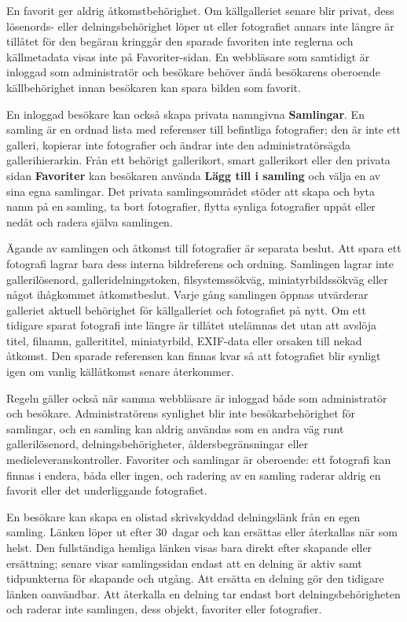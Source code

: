 \documentclass[11pt,a4paper]{article}
\newcommand{\ui}[1]{\textbf{#1}}
\begin{document}
En favorit ger aldrig åtkomstbehörighet. Om källgalleriet senare blir privat,
dess lösenords- eller delningsbehörighet löper ut eller fotografiet annars inte
längre är tillåtet för den begäran kringgår den sparade favoriten inte reglerna
och källmetadata visas inte på Favoriter-sidan. En webbläsare som samtidigt är
inloggad som administratör och besökare behöver ändå besökarens oberoende
källbehörighet innan besökaren kan spara bilden som favorit.

En inloggad besökare kan också skapa privata namngivna \ui{Samlingar}. En
samling är en ordnad lista med referenser till befintliga fotografier; den är
inte ett galleri, kopierar inte fotografier och ändrar inte den
administratörsägda gallerihierarkin. Från ett behörigt gallerikort, smart
gallerikort eller den privata sidan \ui{Favoriter} kan besökaren använda
\ui{Lägg till i samling} och välja en av sina egna samlingar. Det privata
samlingsområdet stöder att skapa och byta namn på en samling, ta bort
fotografier, flytta synliga fotografier uppåt eller nedåt och radera själva
samlingen.

Ägande av samlingen och åtkomst till fotografier är separata beslut. Att spara
ett fotografi lagrar bara dess interna bildreferens och ordning. Samlingen
lagrar inte gallerilösenord, galleridelningstoken, filsystemssökväg,
miniatyrbildssökväg eller något ihågkommet åtkomstbeslut. Varje gång samlingen
öppnas utvärderar galleriet aktuell behörighet för källgalleriet och fotografiet
på nytt. Om ett tidigare sparat fotografi inte längre är tillåtet utelämnas det
utan att avslöja titel, filnamn, gallerititel, miniatyrbild, EXIF-data eller
orsaken till nekad åtkomst. Den sparade referensen kan finnas kvar så att
fotografiet blir synligt igen om vanlig källåtkomst senare återkommer.

Regeln gäller också när samma webbläsare är inloggad både som administratör och
besökare. Administratörens synlighet blir inte besökarbehörighet för samlingar,
och en samling kan aldrig användas som en andra väg runt gallerilösenord,
delningsbehörigheter, åldersbegränsningar eller medieleveranskontroller.
Favoriter och samlingar är oberoende: ett fotografi kan finnas i endera, båda
eller ingen, och radering av en samling raderar aldrig en favorit eller det
underliggande fotografiet.

En besökare kan skapa en olistad skrivskyddad delningslänk från en egen samling.
Länken löper ut efter 30~dagar och kan ersättas eller återkallas när som helst.
Den fullständiga hemliga länken visas bara direkt efter skapande eller
ersättning; senare visar samlingssidan endast att en delning är aktiv samt
tidpunkterna för skapande och utgång. Att ersätta en delning gör den tidigare
länken oanvändbar. Att återkalla en delning tar endast bort delningsbehörigheten
och raderar inte samlingen, dess objekt, favoriter eller fotografier.
\end{document}
